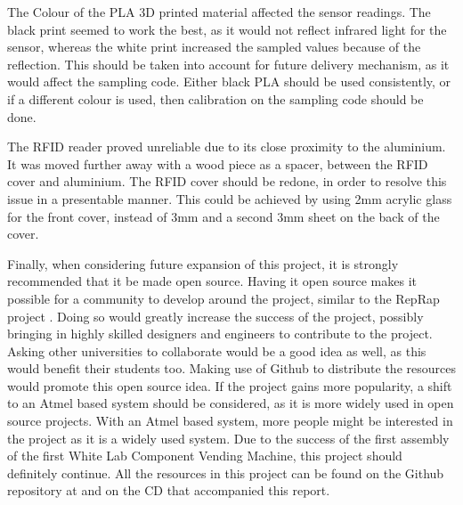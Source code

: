 \documentclass[a4paper,11pt]{article}
\numberwithin{figure}{section}
\numberwithin{table}{section}
\begin{document}
The Colour of the PLA 3D printed material affected the sensor readings. The black print seemed to work the best, as it would not reflect infrared light for the sensor, whereas the white print increased the sampled values because of the reflection. This should be taken into account for future delivery mechanism, as it would affect the sampling code. Either black PLA should be used consistently, or if a different colour is used, then calibration on the sampling code should be done.

The RFID reader proved unreliable due to its close proximity to the aluminium. It was moved further away with a wood piece as a spacer, between the RFID cover and aluminium. The RFID cover should be redone, in order to resolve this issue in a presentable manner. This could be achieved by using 2mm acrylic glass for the front cover, instead of 3mm and a second 3mm sheet on the back of the cover. 

Finally, when considering future expansion of this project, it is strongly recommended that it be made open source. Having it open source makes it possible for a community to develop around the project, similar to the RepRap project \cite{reprap}. Doing so would greatly increase the success of the project, possibly bringing in highly skilled designers and engineers to contribute to the project. Asking other universities to collaborate would be a good idea as well, as this would benefit their students too. Making use of Github to distribute the resources would promote this open source idea. If the project gains more popularity, a shift to an Atmel based system should be considered, as it is more widely used in open source projects. With an Atmel based system, more people might be interested in the project as it is a widely used system. Due to the success of the first assembly of the first White Lab Component Vending Machine, this project should definitely continue. All the resources in this project can be found on the Github repository at \cite{github} and on the CD that accompanied this report.
\newpage




\newpage
\end{document}

